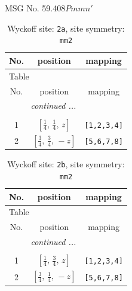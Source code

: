 \documentclass[fleqn,8pt]{jsarticle}
\begin{document}
\setcounter{MaxMatrixCols}{32}

\renewcommand{\tablename}{Table~}
\renewcommand{\figurename}{Figure~}
\begin{center}
\LARGE
MSG No. 59.408\quad$Pmmn'$
\end{center}
\renewcommand{\arraystretch}{1.2}
\begin{longtable}{ccc}
\caption{Wyckoff site: {\tt 2a}, site symmetry: {\tt mm2}}
 \\
 \hline \hline
No. & position & mapping \\ \hline \endfirsthead

\multicolumn{2}{l}{\tablename\ \thetable{}} \\
 \hline \hline
No. & position & mapping \\ \hline \endhead

 \hline \hline
\multicolumn{2}{r}{\footnotesize\it continued ...} \\ \endfoot

 \hline \hline
\multicolumn{2}{r}{} \\ \endlastfoot

1 & $\left[ \frac{1}{4},\, \frac{1}{4},\, z \right]$ & {\tt [1,2,3,4]} \\ \hline
2 & $\left[ \frac{3}{4},\, \frac{3}{4},\, - z \right]$ & {\tt [5,6,7,8]} \\
\end{longtable}
\renewcommand{\arraystretch}{1.2}
\begin{longtable}{ccc}
\caption{Wyckoff site: {\tt 2b}, site symmetry: {\tt mm2}}
 \\
 \hline \hline
No. & position & mapping \\ \hline \endfirsthead

\multicolumn{2}{l}{\tablename\ \thetable{}} \\
 \hline \hline
No. & position & mapping \\ \hline \endhead

 \hline \hline
\multicolumn{2}{r}{\footnotesize\it continued ...} \\ \endfoot

 \hline \hline
\multicolumn{2}{r}{} \\ \endlastfoot

1 & $\left[ \frac{1}{4},\, \frac{3}{4},\, z \right]$ & {\tt [1,2,3,4]} \\ \hline
2 & $\left[ \frac{3}{4},\, \frac{1}{4},\, - z \right]$ & {\tt [5,6,7,8]} \\
\end{longtable}
\end{document}
